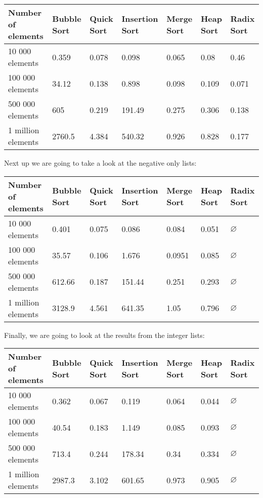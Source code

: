 \documentclass{article}
\numberwithin{figure}{section}
\let\emptyset\varnothing
\begin{document}
\begin{center}
\begin{tabular}{ | m{3.1cm} | m{1cm}| m{1cm} | m{1.3cm} | m{1cm} | m{1cm} | m{1cm} | } 
\hline
Number of elements & Bubble Sort & Quick Sort & Insertion Sort & Merge Sort & Heap Sort & Radix Sort\\ 
\hline
10 000 elements& 0.359 & 0.078 & 0.098 & 0.065 & 0.08 & 0.46 \\ 
\hline
100 000 elements & 34.12 & 0.138 & 0.898 & 0.098 & 0.109 & 0.071 \\ 
\hline
500 000 elements & 605 & 0.219 & 191.49 & 0.275 & 0.306 & 0.138 \\ 
\hline
1 million elements & 2760.5 & 4.384 & 540.32 & 0.926 & 0.828 & 0.177 \\ 
\hline
\end{tabular}
\end{center}

Next up we are going to take a look at the negative only lists:

\begin{center}
\begin{tabular}{ | m{3.1cm} | m{1cm}| m{1cm} | m{1.3cm} | m{1cm} | m{1cm} | m{1cm} | } 
\hline
Number of elements & Bubble Sort & Quick Sort & Insertion Sort & Merge Sort & Heap Sort & Radix Sort\\ 
\hline
10 000 elements& 0.401 & 0.075 & 0.086 & 0.084 & 0.051 &  $\emptyset$\\ 
\hline
100 000 elements & 35.57 & 0.106 & 1.676 & 0.0951 & 0.085 & $\emptyset$ \\ 
\hline
500 000 elements & 612.66 & 0.187 & 151.44 & 0.251 & 0.293 & $\emptyset$ \\ 
\hline
1 million elements & 3128.9 & 4.561 & 641.35 & 1.05 & 0.796 & $\emptyset$ \\ 
\hline
\end{tabular}
\end{center}

Finally, we are going to look at the results from the integer lists:

\begin{center}
\begin{tabular}{ | m{3.1cm} | m{1cm}| m{1cm} | m{1.3cm} | m{1cm} | m{1cm} | m{1cm} | } 
\hline
Number of elements & Bubble Sort & Quick Sort & Insertion Sort & Merge Sort & Heap Sort & Radix Sort\\ 
\hline
10 000 elements& 0.362 & 0.067 & 0.119 & 0.064 & 0.044 & $\emptyset$ \\ 
\hline
100 000 elements & 40.54 & 0.183 & 1.149 & 0.085 & 0.093 & $\emptyset$ \\ 
\hline
500 000 elements & 713.4 & 0.244 & 178.34 & 0.34 & 0.334 & $\emptyset$ \\ 
\hline
1 million elements & 2987.3 & 3.102 & 601.65 & 0.973 & 0.905 & $\emptyset$ \\ 
\hline
\end{tabular}
\end{center}
\end{document}
